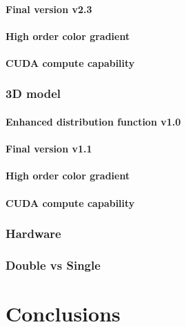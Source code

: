 \documentclass[12pt]{book}
\begin{document}
\subsubsection{Final version v2.3}
\subsubsection{High order color gradient}
\subsubsection{CUDA compute capability}
\subsection{3D model}
\subsubsection{Enhanced distribution function v1.0}
\subsubsection{Final version v1.1}
\subsubsection{High order color gradient}
\subsubsection{CUDA compute capability}
\subsection{Hardware}
\subsection{Double vs Single}
\chapter{Conclusions}

%

\appendix

{}

\end{document}
